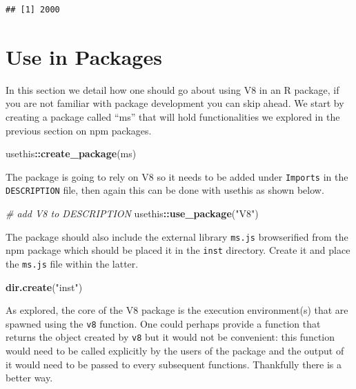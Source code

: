 \documentclass[
]{krantz}
\makeatletter
\newenvironment{Shaded}{\begin{snugshade}}{\end{snugshade}}
\newcommand{\CommentTok}[1]{\textcolor[rgb]{0.37,0.37,0.37}{\textit{#1}}}
\newcommand{\KeywordTok}[1]{\textcolor[rgb]{0.27,0.27,0.27}{\textbf{#1}}}
\newcommand{\NormalTok}[1]{#1}
\newcommand{\OperatorTok}[1]{\textcolor[rgb]{0.43,0.43,0.43}{\textbf{#1}}}
\newcommand{\StringTok}[1]{\textcolor[rgb]{0.5,0.5,0.5}{#1}}
\newenvironment{kframe}{%
\medskip{}
\setlength{\fboxsep}{.8em}
 \def\at@end@of@kframe{}%
 \ifinner\ifhmode%
  \def\at@end@of@kframe{\end{minipage}}%
  \begin{minipage}{\columnwidth}%
 \fi\fi%
 \def\FrameCommand##1{\hskip\@totalleftmargin \hskip-\fboxsep
 \colorbox{shadecolor}{##1}\hskip-\fboxsep
     \hskip-\linewidth \hskip-\@totalleftmargin \hskip\columnwidth}%
 \MakeFramed {\advance\hsize-\width
   \@totalleftmargin\z@ \linewidth\hsize
   \@setminipage}}%
 {\par\unskip\endMakeFramed%
 \at@end@of@kframe}
\renewenvironment{Shaded}{\begin{kframe}}{\end{kframe}}
\makeatother
\begin{document}
\begin{verbatim}
## [1] 2000
\end{verbatim}

\hypertarget{use-in-packages}{%
\section{Use in Packages}\label{use-in-packages}}

In this section we detail how one should go about using V8 in an R package, if you are not familiar with package development you can skip ahead. We start by creating a package called ``ms'' that will hold functionalities we explored in the previous section on npm packages.

\begin{Shaded}
\begin{Highlighting}[]
\NormalTok{usethis}\OperatorTok{::}\KeywordTok{create\_package}\NormalTok{(}\StringTok{\textquotesingle{}ms\textquotesingle{}}\NormalTok{)}
\end{Highlighting}
\end{Shaded}

The package is going to rely on V8 so it needs to be added under \texttt{Imports} in the \texttt{DESCRIPTION} file, then again this can be done with usethis as shown below.

\begin{Shaded}
\begin{Highlighting}[]
\CommentTok{\# add V8 to DESCRIPTION}
\NormalTok{usethis}\OperatorTok{::}\KeywordTok{use\_package}\NormalTok{(}\StringTok{"V8"}\NormalTok{)}
\end{Highlighting}
\end{Shaded}

The package should also include the external library \texttt{ms.js} browserified from the npm package which should be placed it in the \texttt{inst} directory. Create it and place the \texttt{ms.js} file within the latter.

\begin{Shaded}
\begin{Highlighting}[]
\KeywordTok{dir.create}\NormalTok{(}\StringTok{"inst"}\NormalTok{)}
\end{Highlighting}
\end{Shaded}

As explored, the core of the V8 package is the execution environment(s) that are spawned using the \texttt{v8} function. One could perhaps provide a function that returns the object created by \texttt{v8} but it would not be convenient: this function would need to be called explicitly by the users of the package and the output of it would need to be passed to every subsequent functions. Thankfully there is a better way.
\end{document}
